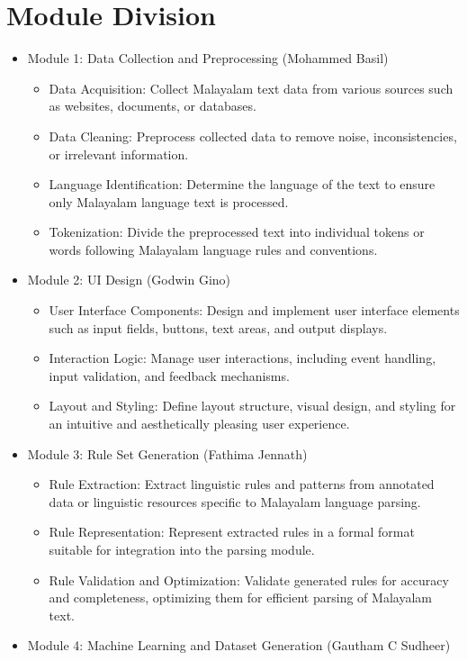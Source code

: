 \documentclass[12pt,a4paper,titlepage]{report}
\begin{document}
	\section{Module Division}
	\begin{itemize}
	\item Module 1: Data Collection and Preprocessing (Mohammed Basil)
	\begin{itemize}
	\item Data Acquisition: Collect Malayalam text data from various sources such as websites, documents, or databases.
	\item Data Cleaning: Preprocess collected data to remove noise, inconsistencies, or irrelevant information.
	\item Language Identification: Determine the language of the text to ensure only Malayalam language text is processed.
	\item Tokenization: Divide the preprocessed text into individual tokens or words following Malayalam language rules and conventions.
\end{itemize}
	\item Module 2: UI Design (Godwin Gino)
	\begin{itemize}
	\item User Interface Components: Design and implement user interface elements such as input fields, buttons, text areas, and output displays.
	\item Interaction Logic: Manage user interactions, including event handling, input validation, and feedback mechanisms.
	\item Layout and Styling: Define layout structure, visual design, and styling for an intuitive and aesthetically pleasing user experience.
\end{itemize}
	\item Module 3: Rule Set Generation (Fathima Jennath)
	\begin{itemize}
	\item Rule Extraction: Extract linguistic rules and patterns from annotated data or linguistic resources specific to Malayalam language parsing.
	\item Rule Representation: Represent extracted rules in a formal format suitable for integration into the parsing module.
	\item Rule Validation and Optimization: Validate generated rules for accuracy and completeness, optimizing them for efficient parsing of Malayalam text.
\end{itemize}
	\item Module 4: Machine Learning and Dataset Generation (Gautham C Sudheer)

\end{itemize}
\end{document}
